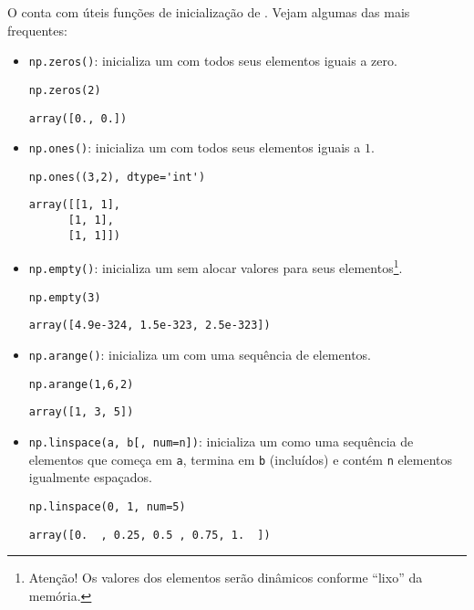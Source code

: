 O {\numpy} conta com úteis funções de inicialização de {\PYTHONnumpyDOTarray}. Vejam algumas das mais frequentes:
\begin{itemize}
\item \texttt{np.zeros()}: inicializa um {\PYTHONnumpyDOTarray} com todos seus elementos iguais a zero.
  
\begin{lstlisting}
np.zeros(2)
\end{lstlisting}

\begin{verbatim}
array([0., 0.])
\end{verbatim}

  \item \texttt{np.ones()}: inicializa um {\PYTHONnumpyDOTarray} com todos seus elementos iguais a $1$.

\begin{lstlisting}
np.ones((3,2), dtype='int')
\end{lstlisting}

\begin{verbatim}
array([[1, 1],
      [1, 1],
      [1, 1]])
\end{verbatim}

  \item \texttt{np.empty()}: inicializa um {\PYTHONnumpyDOTarray} sem alocar valores para seus elementos\footnote{Atenção! Os valores dos elementos serão dinâmicos conforme ``lixo'' da memória.}.
  
\begin{lstlisting}
np.empty(3)
\end{lstlisting}

\begin{verbatim}
array([4.9e-324, 1.5e-323, 2.5e-323])
\end{verbatim}

  \item \texttt{np.arange()}: inicializa um {\PYTHONnumpyDOTarray} com uma sequência de elementos.

\begin{lstlisting}
np.arange(1,6,2)
\end{lstlisting}

\begin{verbatim}
array([1, 3, 5])
\end{verbatim}

  \item \texttt{np.linspace(a, b[, num=n])}: inicializa um {\PYTHONnumpyDOTarray} como uma sequência de elementos que começa em \texttt{a}, termina em \texttt{b} (incluídos) e contém \texttt{n} elementos igualmente espaçados.

\begin{lstlisting}
np.linspace(0, 1, num=5)
\end{lstlisting}

\begin{verbatim}
array([0.  , 0.25, 0.5 , 0.75, 1.  ])
\end{verbatim}

\end{itemize}

